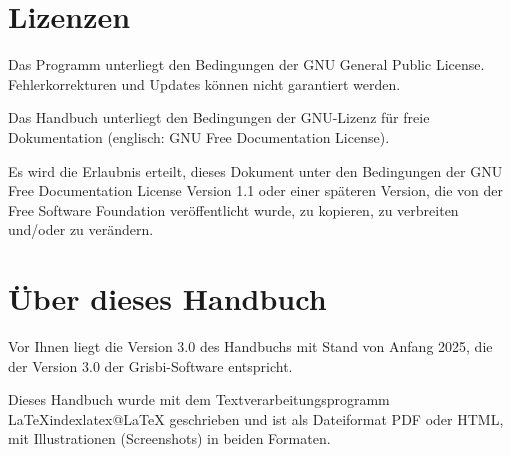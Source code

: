{\section{Lizenzen\label{introduction-licenses}}


Das Programm unterliegt den Bedingungen der \gls{GNU General Public License}. Fehlerkorrekturen und Updates können nicht garantiert werden.

Das Handbuch unterliegt den Bedingungen der \gls{GNU-Lizenz für freie Dokumentation} (englisch: GNU Free Documentation License).

Es wird die Erlaubnis erteilt, dieses Dokument unter den Bedingungen der GNU Free Documentation License Version 1.1 oder einer späteren Version, die von der \gls{Free Software Foundation} veröffentlicht wurde, zu kopieren, zu verbreiten und/oder zu verändern.

\section{Über dieses Handbuch\label{introduction-manual}}


Vor Ihnen liegt die Version 3.0 des Handbuchs mit Stand von \actuality{}Anfang 2025, die der Version 3.0 der Grisbi-Software entspricht.




Dieses Handbuch wurde mit dem Textverarbeitungsprogramm \gls{LaTeX}index{latex@LaTeX} geschrieben und ist als \gls{Dateiformat} \gls{PDF} oder \gls{HTML}, mit Illustrationen (Screenshots) in beiden Formaten.

}
